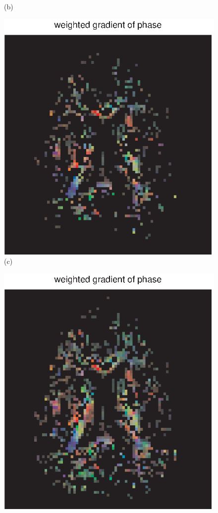 \documentclass[authoryear,preprint,12pt]{elsarticle}
\begin{document}
\begin{figure}[p]
\begin{center}
\begin{minipage}[]{0.42\textwidth}
       (b)
    \end{minipage}
      \begin{minipage}[]{0.42\textwidth}
      \centering
       \includegraphics[width=\textwidth]{gradphase55bny.eps}
        (c)
    \end{minipage}
      \begin{minipage}[]{0.42\textwidth}
      \centering
      \includegraphics[width=\textwidth]{gradphase55dny.eps}

\end{minipage}
\end{center}
\end{figure}
\end{document}
